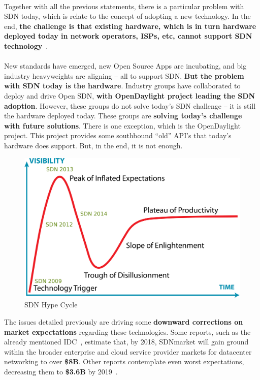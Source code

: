 \documentclass[a4paper, 12pt]{book}
\begin{document}
\\
Together with all the previous statements, there is a particular problem with SDN today, which is relate to the concept of adopting a new technology. In the end, \textbf{the challenge is that existing hardware, which is in turn hardware deployed today in network operators, ISPs, etc, cannot support SDN technology}~\cite{TagArchivesSDN}.\\
\\
New standards have emerged, new Open Source Apps are incubating, and big industry heavyweights are aligning – all to support SDN. \textbf{But the problem with SDN today is the hardware}. Industry groups have collaborated to deploy and drive Open SDN, \textbf{with OpenDaylight project leading the SDN adoption}. However, these groups do not solve today’s SDN challenge – it is still the hardware deployed today. These groups are \textbf{solving today’s challenge with future solutions}. There is one exception, which is the OpenDaylight project. This project provides some southbound ``old'' API’s that today’s hardware does support. But, in the end, it is not enough.
\begin{center}
 \begin{figure}[H]
 \begin{center}
   \includegraphics[width=15cm]{img/hype-cycle-03.png}
   \caption{SDN Hype Cycle}
   \label{fig:sdn_hype_cyle}
 \end{center}
 \end{figure}
\end{center}
The issues detailed previously are driving some \textbf{downward corrections on market expectations} regarding these technologies. Some reports, such as the already mentioned IDC~\cite{SDNMarket20142018IDC}, estimate that, by 2018, SDNmarket will gain ground within the broader enterprise and cloud service provider markets for datacenter networking to over \textbf{\$8B}. Other reports contemplate even worst expectations, decreasing them to \textbf{\$3.6B} by 2019~\cite{SDNMarket20142018PRNewsWire}.
\end{document}
